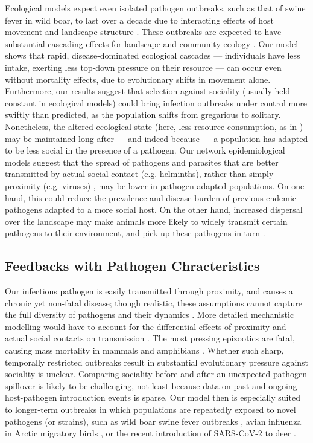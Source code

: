 Ecological models expect even isolated pathogen outbreaks, such as that of swine fever in wild boar, to last over a decade due to interacting effects of host movement and landscape structure \citep{scherer2020}.
These outbreaks are expected to have substantial cascading effects for landscape and community ecology \citep{monk2022}.
Our model shows that rapid, disease-dominated ecological cascades --- individuals have less intake, exerting less top-down pressure on their resource --- can occur even without mortality effects, due to evolutionary shifts in movement alone.
Furthermore, our results suggest that selection against sociality (usually held constant in ecological models) could bring infection outbreaks under control more swiftly than predicted, as the population shifts from gregarious to solitary.
Nonetheless, the altered ecological state (here, less resource consumption, as in \citealt{monk2022}) may be maintained long after --- and indeed because --- a population has adapted to be less social in the presence of a pathogen.
Our network epidemiological models suggest that the spread of pathogens and parasites that are better transmitted by actual social contact (e.g. helminths), rather than simply proximity (e.g. viruses) \citep{rimbach2015}, may be lower in pathogen-adapted populations.
On one hand, this could reduce the prevalence and disease burden of previous endemic pathogens adapted to a more social host.
On the other hand, increased dispersal over the landscape may make animals more likely to widely transmit certain pathogens to their environment, and pick up these pathogens in turn \citep[][]{rimbach2015,weinstein2018,scherer2020}.

\subsection*{Feedbacks with Pathogen Chracteristics}

Our infectious pathogen is easily transmitted through proximity, and causes a chronic yet non-fatal disease; though realistic, these assumptions cannot capture the full diversity of pathogens and their dynamics \citep{white2018,scherer2020, lunn2021}.
More detailed mechanistic modelling would have to account for the differential effects of proximity and actual social contacts on transmission \citep{rimbach2015}.
The most pressing epizootics are fatal, causing mass mortality in mammals \citep{blehert2009, fereidouni2019} and amphibians \citep{scheele2019,sanderson2020}.
Whether such sharp, temporally restricted outbreaks result in substantial evolutionary pressure against sociality is unclear.
Comparing sociality before and after an unexpected pathogen spillover \citep[as in][]{kuchipudi2022} is likely to be challenging, not least because data on past and ongoing host-pathogen introduction events is sparse.
Our model then is especially suited to longer-term outbreaks in which populations are repeatedly exposed to novel pathogens (or strains), such as wild boar swine fever outbreaks \citep{scherer2020}, avian influenza in Arctic migratory birds \citep{globconsorth5n82016}, or the recent introduction of SARS-CoV-2 to deer \citep{kuchipudi2022}.

